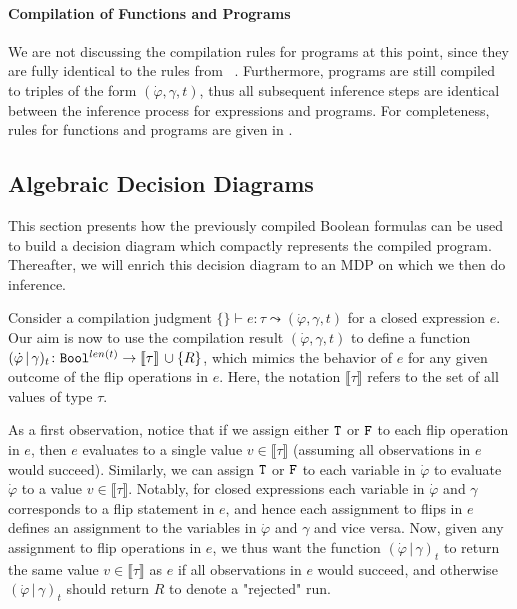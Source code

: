 \paragraph{Compilation of Functions and Programs}
We are not discussing the compilation rules for \NDICE programs at this point, since they are fully identical to the rules from \DICE~\cite{holtzen2020scaling}.
Furthermore, programs are still compiled to triples of the form $(\dot{\varphi}, \gamma, t)$, thus all subsequent inference steps are identical between the inference process for expressions and programs.
For completeness, rules for functions and programs are given in .





\subsection{Algebraic Decision Diagrams}\label{sec:ndice_add}
This section presents how the previously compiled Boolean formulas can be used to build a decision diagram which compactly represents the compiled program.
Thereafter, we will enrich this decision diagram to an MDP on which we then do inference.

Consider a compilation judgment $\{\} \vdash e \colon \tau \leadsto (\dot{\varphi}, \gamma, t)$ for a closed \NDICE expression $e$. 
Our aim is now to use the compilation result $(\dot{\varphi}, \gamma, t)$ to define a function $(\dot{\varphi} \,|\, \gamma)_t\colon \texttt{Bool}^{len(t)}\rightarrow \llbracket\tau \rrbracket \, \cup \{R\}$, which mimics the behavior of $e$ for any given outcome of the flip operations in $e$. 
Here, the notation $\llbracket\tau \rrbracket$ refers to the set of all values of type $\tau$.

As a first observation, notice that if we assign either $\texttt{T}$ or $\texttt{F}$ to each flip operation in $e$,  then $e$ evaluates to a single value $v\in \llbracket\tau \rrbracket$ (assuming all observations in $e$ would succeed).
Similarly, we can assign $\texttt{T}$ or $\texttt{F}$ to each variable in $\dot{\varphi}$ to evaluate $\dot{\varphi}$ to a value $v\in \llbracket\tau \rrbracket$.  
Notably, for closed expressions each variable in $\dot{\varphi}$ and $\gamma$ corresponds to a flip statement in $e$, and hence each assignment to flips in $e$ defines an assignment to the variables in  $\dot{\varphi}$ and $\gamma$ and vice versa.
Now, given any assignment to flip operations in $e$, we thus want the function $(\dot{\varphi} \,|\, \gamma)_t$ to return the same value $v\in \llbracket \tau \rrbracket$ as $e$ if all observations in $e$ would succeed, and otherwise $(\dot{\varphi} \,|\, \gamma)_t$ should return $R$ to denote a "rejected" run.


